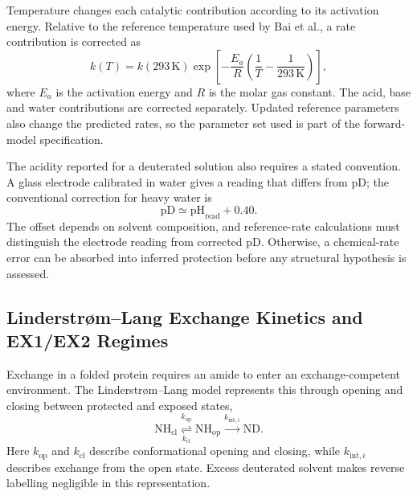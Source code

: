 Temperature changes each catalytic contribution according to its activation energy. Relative to the reference temperature used by Bai et al., a rate contribution is corrected as
\begin{equation}
    k(T)=k(293\,\mathrm{K})
    \exp\!\left[-\frac{E_a}{R}
    \left(\frac{1}{T}-\frac{1}{293\,\mathrm{K}}\right)\right],
    \label{eq:bg-rate-temperature}
\end{equation}
where $E_a$ is the activation energy and $R$ is the molar gas constant. The acid, base and water contributions are corrected separately.\supercite{baiPrimaryStructureEffects1993} Updated reference parameters also change the predicted rates, so the parameter set used is part of the forward-model specification.\supercite{nguyenReferenceParametersProtein2018}

The acidity reported for a deuterated solution also requires a stated convention. A glass electrode calibrated in water gives a reading that differs from pD; the conventional correction for heavy water is
\begin{equation}
    \mathrm{pD}\simeq\mathrm{pH}_{\text{read}}+0.40.
    \label{eq:bg-pd}
\end{equation}
The offset depends on solvent composition, and reference-rate calculations must distinguish the electrode reading from corrected pD.\supercite{glasoeUseGlassElectrodes1960,nguyenReferenceParametersProtein2018} Otherwise, a chemical-rate error can be absorbed into inferred protection before any structural hypothesis is assessed.

\subsection{Linderstr{\o}m--Lang Exchange Kinetics and EX1/EX2 Regimes}
\label{sec:bg-exchange-regimes}

Exchange in a folded protein requires an amide to enter an exchange-competent environment. The Linderstr{\o}m--Lang model represents this through opening and closing between protected and exposed states,
\begin{equation}
    \mathrm{NH}_{\text{cl}}
    \underset{k_{\text{cl}}}{\overset{k_{\text{op}}}{\rightleftharpoons}}
    \mathrm{NH}_{\text{op}}
    \xrightarrow{k_{\text{int},i}}\mathrm{ND}.
    \label{eq:bg-ll-scheme}
\end{equation}
Here $k_{\text{op}}$ and $k_{\text{cl}}$ describe conformational opening and closing, while $k_{\text{int},i}$ describes exchange from the open state. Excess deuterated solvent makes reverse labelling negligible in this representation.\supercite{skinnerProteinHydrogenExchange2012,englanderHydrogenExchangeModern1997}

